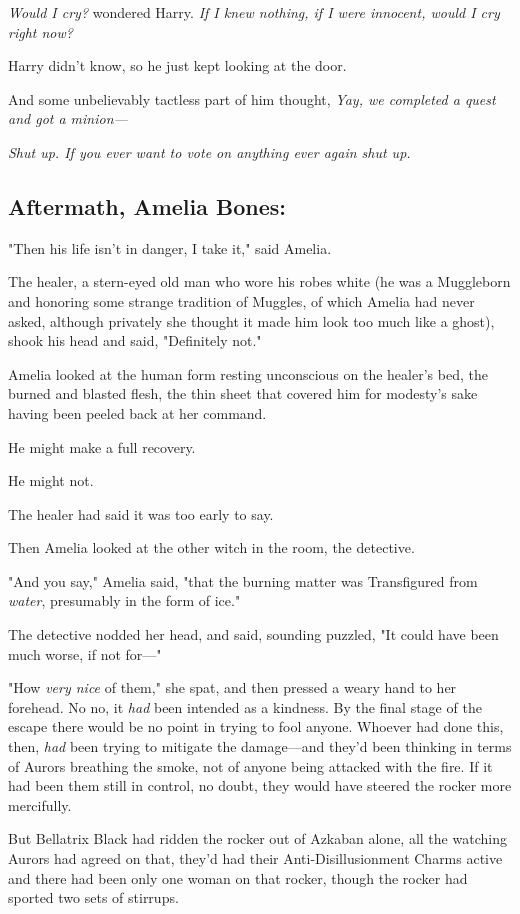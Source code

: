 \emph{Would I cry?} wondered Harry. \emph{If I knew nothing, if I were innocent,
would I cry right now?}

Harry didn't know, so he just kept looking at the door.

And some unbelievably tactless part of him thought, \emph{Yay, we completed a
quest and got a minion---}

\emph{Shut up. If you ever want to vote on anything ever again{\el} shut up.}
\sbreak
\subsection{Aftermath, Amelia Bones:}

"Then his life isn't in danger, I take it," said Amelia.

The healer, a stern-eyed old man who wore his robes white (he was a Muggleborn
and honoring some strange tradition of Muggles, of which Amelia had never
asked, although privately she thought it made him look too much like a ghost),
shook his head and said, "Definitely not."

Amelia looked at the human form resting unconscious on the healer's bed, the
burned and blasted flesh, the thin sheet that covered him for modesty's sake
having been peeled back at her command.

He might make a full recovery.

He might not.

The healer had said it was too early to say.

Then Amelia looked at the other witch in the room, the detective.

"And you say," Amelia said, "that the burning matter was Transfigured from
\emph{water}, presumably in the form of ice."

The detective nodded her head, and said, sounding puzzled, "It could have been
much worse, if not for\mbox{---}"

"How \emph{very nice} of them," she spat, and then pressed a weary hand to her
forehead. No{\el} no, it \emph{had} been intended as a kindness. By the
final stage of the escape there would be no point in trying to fool anyone.
Whoever had done this, then, \emph{had} been trying to mitigate the
damage---and they'd been thinking in terms of Aurors breathing the smoke, not
of anyone being attacked with the fire. If it had been them still in control,
no doubt, they would have steered the rocker more mercifully.

But Bellatrix Black had ridden the rocker out of Azkaban alone, all the
watching Aurors had agreed on that, they'd had their Anti-Disillusionment
Charms active and there had been only one woman on that rocker, though the
rocker had sported two sets of stirrups.


